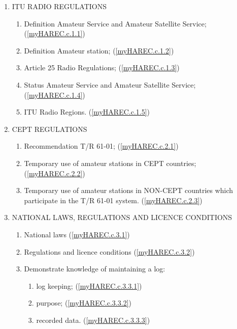 \begin{enumerate}
\item ITU RADIO REGULATIONS
\begin{enumerate}
\item Definition Amateur Service and Amateur Satellite Service; (\ref{myHAREC.c.1.1})\label{HAREC.c.1.1}
\item Definition Amateur station; (\ref{myHAREC.c.1.2})\label{HAREC.c.1.2}
\item Article 25 Radio Regulations; (\ref{myHAREC.c.1.3})\label{HAREC.c.1.3}
\item Status Amateur Service and Amateur Satellite Service; (\ref{myHAREC.c.1.4})\label{HAREC.c.1.4}
\item ITU Radio Regions. (\ref{myHAREC.c.1.5})\label{HAREC.c.1.5}
\end{enumerate}
\item CEPT REGULATIONS
\begin{enumerate}
\item Recommendation T/R 61-01; (\ref{myHAREC.c.2.1})\label{HAREC.c.2.1}
\item Temporary use of amateur stations in CEPT countries; (\ref{myHAREC.c.2.2})\label{HAREC.c.2.2}
\item Temporary use of amateur stations in NON-CEPT countries which participate in the T/R 61-01 system. (\ref{myHAREC.c.2.3})\label{HAREC.c.2.3}
\end{enumerate}
\item NATIONAL LAWS, REGULATIONS AND LICENCE CONDITIONS
\begin{enumerate}
\item National laws (\ref{myHAREC.c.3.1})\label{HAREC.c.3.1}
\item Regulations and licence conditions (\ref{myHAREC.c.3.2})\label{HAREC.c.3.2}
\item Demonstrate knowledge of maintaining a log:
\begin{enumerate}
\item log keeping; (\ref{myHAREC.c.3.3.1})\label{HAREC.c.3.3.1}
\item purpose; (\ref{myHAREC.c.3.3.2})\label{HAREC.c.3.3.2}
\item recorded data. (\ref{myHAREC.c.3.3.3})\label{HAREC.c.3.3.3}
\end{enumerate}
\end{enumerate}
\end{enumerate}

\twocolumn